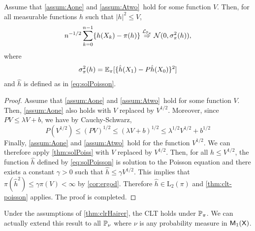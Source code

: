 \documentclass[english,graybox,envcountchap,envcountsame,sectrefs,shortlabels]{svmono}
\theoremstyle{style}
\newenvironment{svmultproof}{\small \begin{proof}}{\end{proof}}
\newcommand{\ltwo}{\mathrm{L}_2}
\newcommand{\dlim}[1]{\stackrel{\mathcal{L}_{#1}}{\Rightarrow}}
\newcommand{\gauss}{\mathcal{N}}
\newcommand{\eqsp}{}
\begin{document}
\begin{shaded}
\begin{theorem} \label{thm:clrHairer}
Assume that \ref{assum:Aone} and \ref{assum:Atwo}\ hold for some function $V$. Then, for all measurable functions $h$ such that $|h|^2\leq V$,
  \begin{align*}
    n^{-1/2} \sum_{k=0}^{n-1} \{h(X_k)-\pi(h)\}  \dlim{\PP_\pi} \gauss(0,\sigma_\pi^2(h)) \eqsp ,
  \end{align*}
  where
  \begin{equation}
  \label{eq:equality-variance}
  \sigma_\pi^2(h) = \PE_\pi[ \{\hat{h}(X_1)-P\hat{h}(X_0)\}^2] %
  \end{equation}
and $\hat h$ is defined as in \eqref{eq:solPoisson}.
\end{theorem}

\end{shaded}

\begin{svmultproof}
Assume that \ref{assum:Aone} and \ref{assum:Atwo}\ hold for some function $V$. Then, \ref{assum:Aone} also holds with $V$ replaced by $V^{1/2}$. Moreover, since $PV\leq \lambda V +b$, we have by Cauchy-Schwarz,
$$
P(V^{1/2}) \leq (PV)^{1/2}\leq (\lambda V +b)^{1/2}\leq  \lambda^{1/2} V^{1/2}+b^{1/2}
$$
Finally, \ref{assum:Aone} and \ref{assum:Atwo}\ hold for the function $V^{1/2}$. We can therefore apply \autoref{thm:solPoiss} with $V$ replaced by $V^{1/2}$. Then, for all $h\leq V^{1/2}$, the function $\hat h$ defined by \eqref{eq:solPoisson} is solution to the Poisson equation and there exists a constant $\gamma>0$ such that
$\hat h\leq \gamma V^{1/2}$. This implies that $\pi(\hat h^2) \leq \gamma \pi(V)<\infty$ by \autoref{cor:ergod}. Therefore $\hat{h} \in \ltwo(\pi)$ and  \autoref{thm:clt-poisson} applies. The proof is completed.
\end{svmultproof}

Under the assumptions of \autoref{thm:clrHairer}, the CLT holds under $\mathbb{P}_\pi$. We can actually extend this result to all $\mathbb{P}_\nu$ where $\nu$ is any probability measure in $\mathsf{M}_{1}(\mathsf{X})$.
\end{document}

